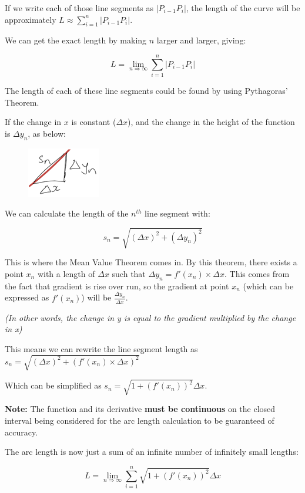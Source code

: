 \documentclass[../main.tex]{subfiles}
\begin{document}
If we write each of those line segments as $|P_{i-1} P_{i}|$, the length of the curve will be approximately $L\approx \sum\limits_{i=1}^n |P_{i-1} P_i|$.

We can get the exact length by making $n$ larger and larger, giving:

\[L=\lim\limits_{n \Rightarrow \infty} \sum\limits_{i=1}^n |P_{i-1} P_i|\]


The length of each of these line segments could be found by using Pythagoras' Theorem. 

If the change in $x$ is constant ($\Delta x$), and the change in the height of the function is $\Delta y_n$, as below:

\begin{figure}[h]
    \centering
    \includegraphics[width=0.2\linewidth]{images/arclength3.png}
\end{figure}

We can calculate the length of the $n^{th}$ line segment with:

\[s_n=\sqrt{(\Delta x)^2+(\Delta y_n)^2}\]


This is where the Mean Value Theorem comes in. By this theorem, there exists a point $x_n$ with a length of $\Delta x$ such that $\Delta y_n=f'(x_n)\times \Delta x$. This comes from the fact that gradient is rise over run, so the gradient at point $x_n$ (which can be expressed as $f'(x_n)$) will be $\frac{\Delta y_n}{\Delta x}$.

\textit{(In other words, the change in y is equal to the gradient multiplied by the change in x)}

This means we can rewrite the line segment length as $s_n=\sqrt{(\Delta x)^2+(f'(x_n)\times \Delta x)^2}$

Which can be simplified as $s_n=\sqrt{1+(f'(x_n))^2}\Delta x$.

\textbf{Note:} The function and its derivative \textbf{must be continuous} on the closed interval being considered for the arc length calculation to be guaranteed of accuracy.

The arc length is now just a sum of an infinite number of infinitely small lengths:

\[L=\lim\limits_{n \Rightarrow \infty} \sum\limits_{i=1}^n \sqrt{1+(f'(x_n))^2} \Delta x\]
\end{document}
